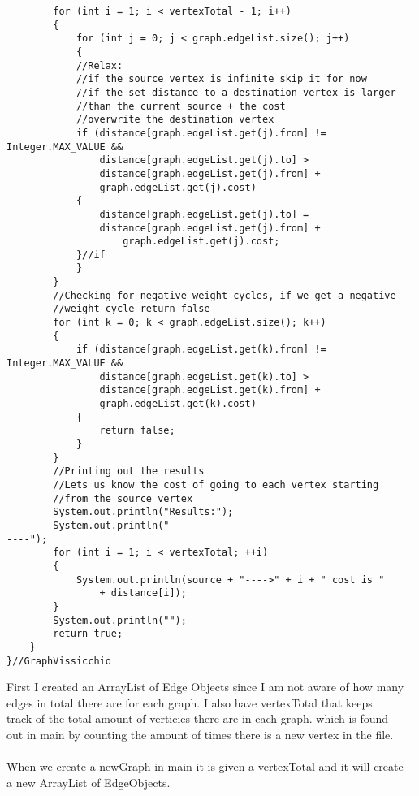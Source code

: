 \documentclass[letterpaper, 10pt]{article}
\begin{document}
\begin{lstlisting}
        for (int i = 1; i < vertexTotal - 1; i++)
        {
            for (int j = 0; j < graph.edgeList.size(); j++)
            {
            //Relax:
            //if the source vertex is infinite skip it for now
            //if the set distance to a destination vertex is larger 
            //than the current source + the cost 
            //overwrite the destination vertex
            if (distance[graph.edgeList.get(j).from] != Integer.MAX_VALUE &&
                distance[graph.edgeList.get(j).to] > 
                distance[graph.edgeList.get(j).from] +
                graph.edgeList.get(j).cost)
            {
                distance[graph.edgeList.get(j).to] = 
                distance[graph.edgeList.get(j).from] +
                    graph.edgeList.get(j).cost;
            }//if
            }
        }
        //Checking for negative weight cycles, if we get a negative 
        //weight cycle return false
        for (int k = 0; k < graph.edgeList.size(); k++)
        {
            if (distance[graph.edgeList.get(k).from] != Integer.MAX_VALUE &&
                distance[graph.edgeList.get(k).to] >
                distance[graph.edgeList.get(k).from] +
                graph.edgeList.get(k).cost)
            {
                return false;
            }
        }
        //Printing out the results
        //Lets us know the cost of going to each vertex starting 
        //from the source vertex
        System.out.println("Results:");
        System.out.println("----------------------------------------------");
        for (int i = 1; i < vertexTotal; ++i)
        {
            System.out.println(source + "---->" + i + " cost is " 
                + distance[i]);
        }
        System.out.println("");
        return true;
    }
}//GraphVissicchio
\end{lstlisting}
\noindent
First I created an ArrayList of Edge Objects since I am not aware of how many\\
edges in total there are for each graph. I also have vertexTotal that keeps\\
track of the total amount of verticies there are in each graph. which is found\\
out in main by counting the amount of times there is a new vertex in the file.\\
\\
When we create a newGraph in main it is given a vertexTotal and it will create\\
a new ArrayList of EdgeObjects. \\
\\
\end{document}
